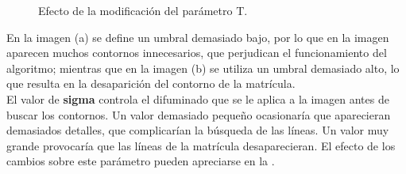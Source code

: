 \begin{figure}[!h]
\centering {}
\caption{\small{Efecto de la modificación del parámetro T.}} \label{CannyT}
\end{figure} 

En la imagen (a) se define un umbral demasiado bajo, por lo que en la imagen aparecen muchos contornos innecesarios, que perjudican el funcionamiento del algoritmo; mientras que en la imagen (b) se utiliza un umbral demasiado alto, lo que resulta en la desaparición del contorno de la matrícula.\\


El valor de \textbf{sigma} controla el difuminado que se le aplica a la imagen antes de buscar los contornos. Un valor demasiado pequeño ocasionaría que aparecieran demasiados detalles, que complicarían la búsqueda de las líneas. Un valor muy grande provocaría que las líneas de la matrícula desaparecieran. El efecto de los cambios sobre este parámetro pueden apreciarse en la .\\

